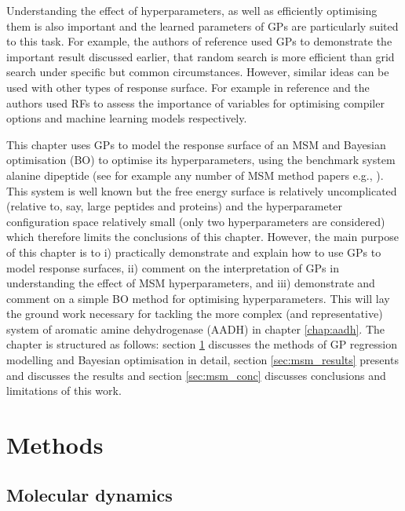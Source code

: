 Understanding the effect of hyperparameters, as well as efficiently optimising them is also important and the learned parameters of GPs are particularly suited to this task\cite{rasmussenGaussianProcessesMachine2006}. For example, the authors of reference \cite{bergstrajamesbergstraRandomSearchHyperParameter2012} used GPs to demonstrate the important result discussed earlier, that random search is more efficient than grid search under specific but common circumstances. However, similar ideas can be used with other types of response surface. For example in  reference \cite{gramacyVariableSelectionSensitivity2013} and \cite{pmlr-v32-hutter14} the authors used  RFs to assess the importance of variables for optimising compiler options and machine learning models respectively. 

This chapter uses GPs to model the response surface of an MSM  and Bayesian optimisation (BO) to optimise its hyperparameters, using the benchmark system alanine dipeptide (see for example any number of MSM method papers e.g.,  \cite{wehmeyerTimelaggedAutoencodersDeep2018a,nuskeVariationalApproachMolecular2014,bowmanQuantitativeComparisonAlternative2013}). This system is well known but the free energy surface is relatively uncomplicated (relative to, say, large peptides and proteins) and the hyperparameter configuration space relatively small (only two hyperparameters are considered) which therefore limits the conclusions of this chapter. However, the main purpose of this chapter is to i) practically demonstrate and explain how to use GPs to model response surfaces, ii) comment on the interpretation of GPs in understanding the effect of MSM hyperparameters, and iii) demonstrate and comment on a simple BO method for optimising hyperparameters. This will lay the ground work necessary for tackling the more complex (and representative) system of aromatic amine dehydrogenase (AADH) in chapter \ref{chap:aadh}. The chapter is structured as follows: section \ref{sec:msm_methods} discusses the methods of GP regression modelling and Bayesian optimisation in detail, section \ref{sec:msm_results} presents and discusses the results and section \ref{sec:msm_conc} discusses conclusions and limitations of this work. 

\section{Methods}\label{sec:msm_methods}
\subsection{Molecular dynamics}

